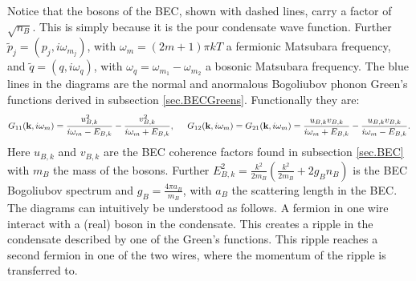 Notice that the bosons of the BEC, shown with dashed lines, carry a factor of $\sqrt{n_B}$. This is simply because it is the pour condensate wave function. Further $\tilde{p}_j = (p_j, i\omega_{m_j})$, with $\omega_{m} = (2m + 1)\pi kT$ a fermionic Matsubara frequency, and $\tilde{q} = (q, i\omega_q )$, with $\omega_q = \omega_{m_1} - \omega_{m_2}$ a bosonic Matsubara frequency. The blue lines in the diagrams are the normal and anormalous Bogoliubov phonon Green's functions derived in subsection \ref{sec.BECGreens}. Functionally they are:
\begin{equation}
G_{11}(\mathbf{k},i\omega_m) = \frac{u_{B,k}^2}{i\omega_m-E_{B,k}}-\frac{v_{B,k}^2}{i\omega_m+E_{B,k}}, \hspace{0.5cm} G_{12}(\mathbf{k},i\omega_m) = G_{21}(\mathbf{k},i\omega_m) = \frac{u_{B,k}v_{B,k}}{i\omega_m+E_{B,k}}-\frac{u_{B,k}v_{B,k}}{i\omega_m-E_{B,k}}.\nonumber
\end{equation}
Here $u_{B,k}$ and $v_{B,k}$ are the BEC coherence factors found in subsection \ref{sec.BEC} with $m_B$ the mass of the bosons. Further $E^2_{B,k} = \frac{k^2}{2m_B}\left(\frac{k^2}{2m_B} + 2g_Bn_B \right)$ is the BEC Bogoliubov spectrum and $g_B = \frac{4\pi a_B}{m_B}$, with $a_B$ the scattering length in the BEC. The diagrams can intuitively be understood as follows. A fermion in one wire interact with a (real) boson in the condensate. This creates a ripple in the condensate described by one of the Green's functions. This ripple reaches a second fermion in one of the two wires, where the momentum of the ripple is transferred to.  

